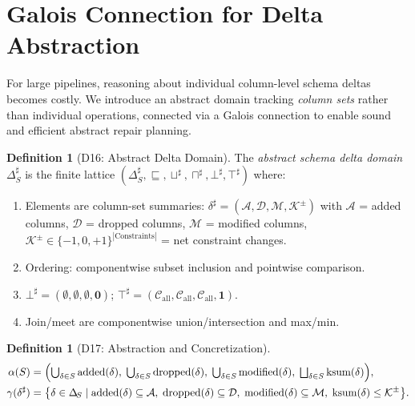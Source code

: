 \documentclass[11pt,a4paper]{article}
\theoremstyle{definition}
\newtheorem{definition}[theorem]{Definition}
\newcommand{\DeltaS}{\Delta_{\!S}}
\begin{document}
\section{Galois Connection for Delta Abstraction}
\label{sec:galois}

For large pipelines, reasoning about individual column-level schema deltas
becomes costly.  We introduce an abstract domain tracking \emph{column sets}
rather than individual operations, connected via a Galois connection to enable
sound and efficient abstract repair planning.

\begin{definition}[D16: Abstract Delta Domain]\label{def:abstract-delta}
The \emph{abstract schema delta domain} $\DeltaS^\sharp$ is the finite lattice
$(\DeltaS^\sharp, \sqsubseteq, \sqcup^\sharp, \sqcap^\sharp,
\bot^\sharp, \top^\sharp)$ where:
\begin{enumerate}[nosep]
  \item Elements are column-set summaries:
    $\delta^\sharp = (\mathcal{A}, \mathcal{D}, \mathcal{M}, \mathcal{K}^\pm)$
    with $\mathcal{A}$ = added columns, $\mathcal{D}$ = dropped columns,
    $\mathcal{M}$ = modified columns, $\mathcal{K}^\pm \in \{-1,0,+1\}^{|\mathrm{Constraints}|}$
    = net constraint changes.
  \item Ordering: componentwise subset inclusion and pointwise comparison.
  \item $\bot^\sharp = (\emptyset, \emptyset, \emptyset, \mathbf{0})$;
    $\top^\sharp = (\mathcal{C}_{\mathrm{all}}, \mathcal{C}_{\mathrm{all}},
    \mathcal{C}_{\mathrm{all}}, \mathbf{1})$.
  \item Join/meet are componentwise union/intersection and max/min.
\end{enumerate}
\end{definition}

\begin{definition}[D17: Abstraction and Concretization]\label{def:galois-pair}
\begin{align*}
\alpha(S) &= \Bigl(
  \textstyle\bigcup_{\delta \in S} \mathrm{added}(\delta),\;
  \bigcup_{\delta \in S} \mathrm{dropped}(\delta),\;
  \bigcup_{\delta \in S} \mathrm{modified}(\delta),\;
  \bigsqcup_{\delta \in S} \mathrm{ksum}(\delta)
\Bigr), \\
\gamma(\delta^\sharp) &= \bigl\{\delta \in \DeltaS \mid
  \mathrm{added}(\delta) \subseteq \mathcal{A},\;
  \mathrm{dropped}(\delta) \subseteq \mathcal{D},\;
  \mathrm{modified}(\delta) \subseteq \mathcal{M},\;
  \mathrm{ksum}(\delta) \le \mathcal{K}^\pm
\bigr\}.
\end{align*}
\end{definition}
\end{document}
